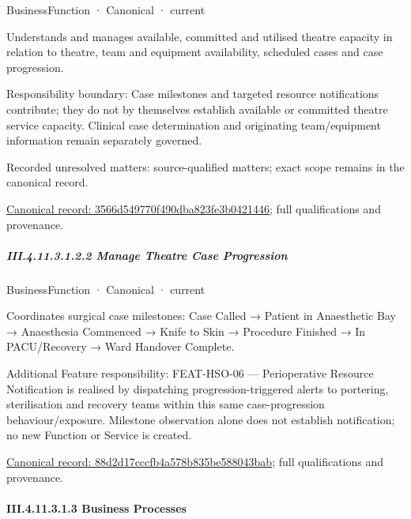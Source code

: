 \label{element:3566d549770f490dba823fe3b0421446}
{\small BusinessFunction · Canonical · current}\par

Understands and manages available, committed and utilised theatre capacity in relation to theatre, team and equipment availability, scheduled cases and case progression.



Responsibility boundary: Case milestones and targeted resource notifications contribute; they do not by themselves establish available or committed theatre service capacity. Clinical case determination and originating team/equipment information remain separately governed.


{\small Recorded unresolved matters: source-qualified matters; exact scope remains in the canonical record.}\par
{\footnotesize \href{../../../../../../../../continuum/business/business-function/3566d549770f490dba823fe3b0421446.md}{Canonical record: 3566d549770f490dba823fe3b0421446}; full qualifications and provenance.}\par
\subparagraph*{III.4.11.3.1.2.2 Manage Theatre Case Progression}
\label{navigation:III.4.11.3.1.2.2}

\label{element:88d2d17cccfb4a578b835be588043bab}
{\small BusinessFunction · Canonical · current}\par

Coordinates surgical case milestones: Case Called → Patient in Anaesthetic Bay → Anaesthesia Commenced → Knife to Skin → Procedure Finished → In PACU/Recovery → Ward Handover Complete.



Additional Feature responsibility: FEAT-HSO-06 — Perioperative Resource Notification is realised by dispatching progression-triggered alerts to portering, sterilisation and recovery teams within this same case-progression behaviour/exposure. Milestone observation alone does not establish notification; no new Function or Service is created.


{\footnotesize \href{../../../../../../../../continuum/business/business-function/88d2d17cccfb4a578b835be588043bab.md}{Canonical record: 88d2d17cccfb4a578b835be588043bab}; full qualifications and provenance.}\par
\paragraph*{III.4.11.3.1.3 Business Processes}
\label{navigation:III.4.11.3.1.3}

